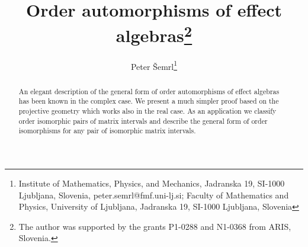 \documentclass{article}
\begin{document}
\newcommand{\A}{\cal{A}}
\newcommand{\R}{\cal{R}}
\newcommand{\F}{\mathbb{F}}
\newcommand{\C}{\cal{C}}
\newcommand{\N}{\cal{N}}
\newcommand{\cH}{\cal{H}}
\newcommand{\G}{\cal{G}}
\newcommand{\Z}{\cal{Z}}
\newcommand{\T}{\cal{T}}
\newcommand{\Q}{\cal{Q}}
\newcommand{\cS}{\cal{S}}
\newcommand{\W}{\cal{W}}
\newcommand{\E}{\cal{E}}
\newcommand{\D}{\cal{D}}
\newcommand{\cP}{\cal{P}}
\newcommand{\cL}{\cal{L}}
\newcommand{\M}{\cal{M}}
\newcommand{\V}{\cal{V}}
\newcommand{\B}{\cal{B}}
\newcommand{\U}{\cal{U}}
\newcommand{\K}{\cal{K}}
\newcommand{\CC}{{\mathbb C}}
\newcommand{\Aa}{{\mathbb A}}
\newcommand{\FF}{{\mathbb F}}
\newcommand{\FFF}{\overline{\mathbb F}}
\newcommand{\ov}{\overline}
\newcommand{\eps}{\varepsilon}
\newcommand{\wh}[1]{\widehat{#1}}
\newtheorem{theorem}{Theorem}[section]
\newtheorem{proposition}[theorem]{Proposition}
\newtheorem{lemma}[theorem]{Lemma}
\newtheorem{corollary}[theorem]{Corollary}
\newtheorem{remark}[theorem]{Remark}
\newtheorem{definition}[theorem]{Definition}            
\newtheorem{example}[theorem]{Example}            
\newtheorem{conjecture}[theorem]{Conjqecture}
\newtheorem{question}[theorem]{Question}




\title{Order automorphisms of effect algebras\thanks{The author was supported by the grants P1-0288 and N1-0368 from ARIS, Slovenia.}}
\author{Peter \v Semrl\footnote{Institute of Mathematics, Physics, and Mechanics, Jadranska 19, SI-1000 Ljubljana, Slovenia, peter.semrl@fmf.uni-lj.si; Faculty of Mathematics and Physics, University of Ljubljana, Jadranska 19, SI-1000 Ljubljana, Slovenia}
        }

\date{}
\maketitle









\begin{abstract}
An elegant description of the general form of order automorphisms of effect algebras has been known in the complex case. We present a much simpler proof based on the projective geometry which works also in the real case. As an application we classify order isomorphic pairs of matrix intervals and describe the general form of order isomorphisms for any pair of isomorphic matrix intervals. 
\end{abstract}
\maketitle
\end{document}
